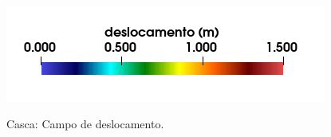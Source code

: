\documentclass[tese_patricia]{subfiles}
\begin{document}
\begin{figure}[!htb]
	\\
	{\includegraphics[scale=0.3,trim=0cm 0cm 0cm 0cm, clip=true]{Imagens/Cap4/legenda.png}}
	\caption{Casca: Campo de deslocamento.}
	\label{fig:CamposDeslocamentos}
\end{figure}




\end{document}
